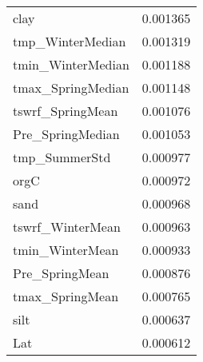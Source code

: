 \begin{tabular}{lr}
clay & 0.001365 \\
tmp_WinterMedian & 0.001319 \\
tmin_WinterMedian & 0.001188 \\
tmax_SpringMedian & 0.001148 \\
tswrf_SpringMean & 0.001076 \\
Pre_SpringMedian & 0.001053 \\
tmp_SummerStd & 0.000977 \\
orgC & 0.000972 \\
sand & 0.000968 \\
tswrf_WinterMean & 0.000963 \\
tmin_WinterMean & 0.000933 \\
Pre_SpringMean & 0.000876 \\
tmax_SpringMean & 0.000765 \\
silt & 0.000637 \\
Lat & 0.000612 \\
\bottomrule
\end{tabular}
